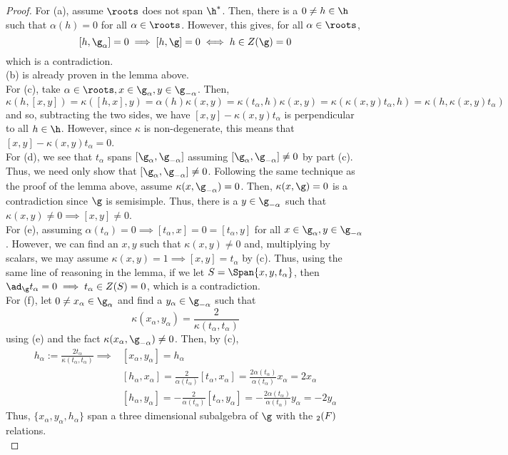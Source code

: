 \documentclass[11pt,leqno,oneside]{amsart}
\numberwithin{thm}{section}
\begin{document}
\begin{proof}
  For (a), assume \(\roots\) does not span \(\h^*\). Then, there is a
  \(0 \neq h \in \h\) such that \(\alpha(h) = 0\) for all \(\alpha \in
  \roots\). However, this gives, for all \(\alpha \in \roots\), \[
    [h,\g_\alpha] = 0 \implies [h,\g] = 0 \iff h \in Z(\g) = 0
  \]
  which is a contradiction. \\

  (b) is already proven in the lemma above. \\

  For (c), take \(\alpha \in \roots, x \in \g_{\alpha}, y \in
  \g_{-\alpha}\). Then, \[
    \kappa(h,[x,y]) = \kappa([h,x],y) = \alpha(h)\kappa(x,y) =
    \kappa(t_\alpha, h)\kappa(x,y) = \kappa(\kappa(x,y)t_\alpha,h) = \kappa(h,\kappa(x,y)t_\alpha)
  \]
  and so, subtracting the two sides, we have
  \([x,y]-\kappa(x,y)t_\alpha\) is perpendicular to all \(h \in
  \h\). However, since \(\kappa\) is non-degenerate, this means that
  \([x,y] - \kappa(x,y)t_\alpha = 0\). \\

  For (d), we see that \(t_\alpha\) spans \([\g_\alpha,
  \g_{-\alpha}]\) assuming \([\g_\alpha, \g_{-\alpha}] \neq 0\) by part
  (c). Thus, we need only show that \([\g_\alpha, \g_{-\alpha}] \neq
  0\). Following the same technique as the proof of the lemma above,
  assume \(\kappa(x, \g_{-\alpha}) = 0\). Then, \(\kappa(x,\g) = 0\)
  is a contradiction since \(\g\) is semisimple. Thus, there is a \(y
  \in \g_{-\alpha}\) such that \(\kappa(x,y) \neq 0 \implies [x,y]
  \neq 0\). \\

  For (e), assuming \(\alpha(t_\alpha) = 0 \implies [t_\alpha, x] = 0
  = [t_\alpha, y]\) for all \(x \in \g_\alpha, y \in
  \g_{-\alpha}\). However, we can find an \(x,y\) such that
  \(\kappa(x,y) \neq 0\) and, multiplying by scalars, we may assume
  \(\kappa(x,y) = 1 \implies [x,y] = t_\alpha\) by (c). Thus, using
  the same line of reasoning in the lemma, if we let \(S =
  \Span\{x,y,t_\alpha\}\), then \(\ad_\g t_\alpha = 0 \implies
  t_\alpha \in Z(S) = 0\), which is a contradiction. \\

  For (f), let \(0 \neq x_\alpha \in \g_\alpha\) and find a \(y_\alpha
  \in \g_{-\alpha}\) such that \[
    \kappa(x_\alpha, y_\alpha) = \frac{2}{\kappa(t_\alpha, t_\alpha)}
  \]
  using (e) and the fact \(\kappa(x_\alpha, \g_{-\alpha}) \neq
  0\). Then, by (c),
  \begin{align*}
    h_\alpha := \frac{2 t_\alpha}{\kappa(t_\alpha, t_\alpha)}
    \implies & [x_\alpha, y_\alpha] = h_\alpha \\
    & [h_\alpha, x_\alpha] = \frac{2}{\alpha(t_\alpha)}[t_\alpha,x_\alpha] =
      \frac{2 \alpha(t_\alpha)}{\alpha(t_\alpha)}x_\alpha = 2 x_\alpha
    \\
    & [h_\alpha, y_\alpha] = -\frac{2}{\alpha(t_\alpha)}[t_\alpha,
      y_\alpha] = -\frac{2 \alpha(t_\alpha)}{\alpha(t_\alpha)}
      y_\alpha = -2 y_\alpha
  \end{align*}
  Thus, \(\{x_\alpha, y_\alpha,h_\alpha\}\) span a three dimensional
  subalgebra of \(\g\) with the \(\sl_2(F)\) relations.\\


\end{proof}
\end{document}
